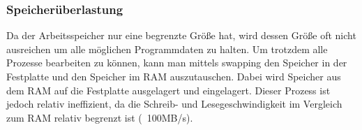 \documentclass{article}
\begin{document}
	\subsubsection{Speicherüberlastung}
	Da der Arbeitsspeicher nur eine begrenzte Größe hat, wird dessen Größe oft nicht ausreichen um alle möglichen Programmdaten zu halten. Um trotzdem alle Prozesse bearbeiten zu können, kann man mittels swapping den Speicher in der Festplatte und den Speicher im RAM auszutauschen. Dabei wird Speicher aus dem RAM auf die Festplatte ausgelagert und eingelagert. Dieser Prozess ist jedoch relativ ineffizient, da die Schreib- und Lesegeschwindigkeit im Vergleich zum RAM relativ begrenzt ist (~{}100MB/s).
\end{document}
